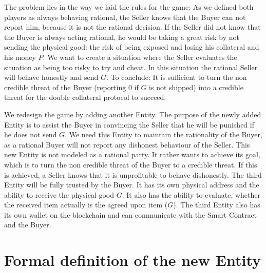 \documentclass{cacthesis}
\begin{document}
The problem lies in the way we laid the rules for the game: As we defined both players as always behaving rational, the Seller knows that the Buyer can not report him, because it is not the rational decision.\newline
If the Seller did not know that the Buyer is always acting rational, he would be taking a great risk by not sending the physical good: the risk of being exposed and losing his collateral and his money $P$.\newline
We want to create a situation where the Seller evaluates the situation as being too risky to try and cheat. In this situation the rational Seller will behave honestly and  send $G$.\newline
To conclude: It is sufficient to turn the non credible threat of the Buyer (reporting 0 if $G$ is not shipped) into a credible threat for the double collateral protocol to succeed.

We redesign the game by adding another Entity. The purpose of the newly added Entity is to assist the Buyer in convincing the Seller that he will be punished if he does not send $G$. We need this Entity to maintain the rationality of the Buyer, as a rational Buyer will not report any dishonest behaviour of the Seller.\newline
This new Entity is not modeled as a rational party. It rather wants to achieve its goal, which is to turn the non credible threat of the Buyer to a credible threat. If this is achieved, a Seller knows that it is unprofitable to behave dishonestly.\newline
The third Entity will be fully trusted by the Buyer. It has its own physical address and  the ability to receive the physical good $G$. It also has the ability to evaluate, whether the received item actually is the agreed upon item ($G$).\newline
The third Entity also has its own wallet on the blockchain and can communicate with the Smart Contract and the Buyer.

\section{Formal definition of the new Entity}
\end{document}
